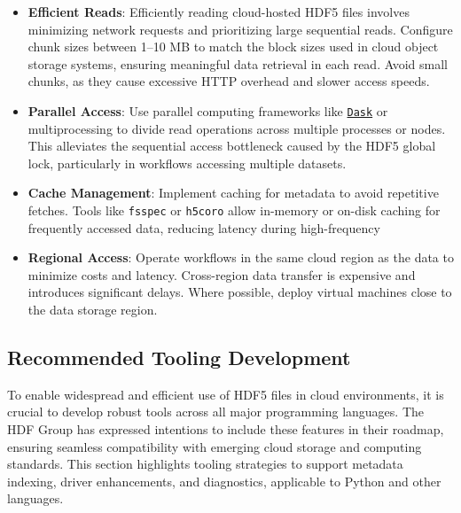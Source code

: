 \documentclass[
]{agujournal2019}
\providecommand{\tightlist}{%
  \setlength{\itemsep}{0pt}\setlength{\parskip}{0pt}}\usepackage{longtable,booktabs,array}
\begin{document}
\begin{itemize}
\tightlist
\item
  \textbf{Efficient Reads}: Efficiently reading cloud-hosted HDF5 files
  involves minimizing network requests and prioritizing large sequential
  reads. Configure chunk sizes between 1--10 MB to match the block sizes
  used in cloud object storage systems, ensuring meaningful data
  retrieval in each read. Avoid small chunks, as they cause excessive
  HTTP overhead and slower access speeds.
\item
  \textbf{Parallel Access}: Use parallel computing frameworks like
  \href{https://www.dask.org/}{\texttt{Dask}} or multiprocessing to
  divide read operations across multiple processes or nodes. This
  alleviates the sequential access bottleneck caused by the HDF5 global
  lock, particularly in workflows accessing multiple datasets.
\item
  \textbf{Cache Management}: Implement caching for metadata to avoid
  repetitive fetches. Tools like \texttt{fsspec} or \texttt{h5coro}
  allow in-memory or on-disk caching for frequently accessed data,
  reducing latency during high-frequency
\item
  \textbf{Regional Access}: Operate workflows in the same cloud region
  as the data to minimize costs and latency. Cross-region data transfer
  is expensive and introduces significant delays. Where possible, deploy
  virtual machines close to the data storage region.
\end{itemize}

\subsection{Recommended Tooling
Development}\label{recommended-tooling-development}

To enable widespread and efficient use of HDF5 files in cloud
environments, it is crucial to develop robust tools across all major
programming languages. The HDF Group has expressed intentions to include
these features in their roadmap, ensuring seamless compatibility with
emerging cloud storage and computing standards. This section highlights
tooling strategies to support metadata indexing, driver enhancements,
and diagnostics, applicable to Python and other languages.
\end{document}
